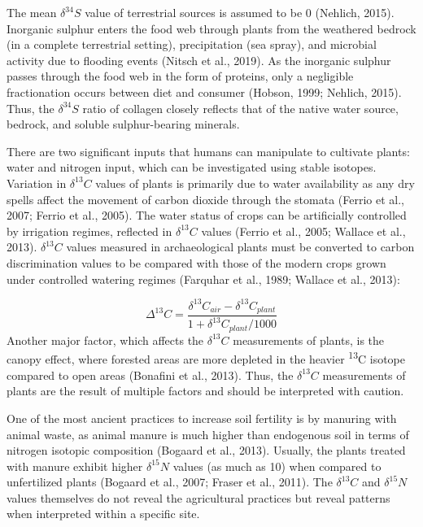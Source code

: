 \documentclass[review]{elsarticle} %
\begin{document}
The mean \(\delta ^{34}S\) value of terrestrial sources is assumed to be 0\text{\textperthousand} (Nehlich, 2015). Inorganic sulphur enters the food web through plants from the weathered bedrock (in a complete terrestrial setting), precipitation (sea spray), and microbial activity due to flooding events (Nitsch et al., 2019). As the inorganic sulphur passes through the food web in the form of proteins, only a negligible fractionation occurs between diet and consumer (Hobson, 1999; Nehlich, 2015). Thus, the \(\delta ^{34}S\) ratio of collagen closely reflects that of the native water source, bedrock, and soluble sulphur-bearing minerals.

There are two significant inputs that humans can manipulate to cultivate plants: water and nitrogen input, which can be investigated using stable isotopes. Variation in \(\delta ^{13}C\) values of plants is primarily due to water availability as any dry spells affect the movement of carbon dioxide through the stomata (Ferrio et al., 2007; Ferrio et al., 2005). The water status of crops can be artificially controlled by irrigation regimes, reflected in \(\delta ^{13}C\) values (Ferrio et al., 2005; Wallace et al., 2013). \(\delta ^{13}C\) values measured in archaeological plants must be converted to carbon discrimination values to be compared with those of the modern crops grown under controlled watering regimes (Farquhar et al., 1989; Wallace et al., 2013):

\[\Delta^{13}C = \frac{\delta ^{13}C_{air} - \delta ^{13}C_{plant}}{1+\delta ^{13}C_{plant}/1000}\]
Another major factor, which affects the \(\delta ^{13}C\) measurements of plants, is the canopy effect, where forested areas are more depleted in the heavier \textsuperscript{13}C isotope compared to open areas (Bonafini et al., 2013). Thus, the \(\delta ^{13}C\) measurements of plants are the result of multiple factors and should be interpreted with caution.

One of the most ancient practices to increase soil fertility is by manuring with animal waste, as animal manure is much higher than endogenous soil in terms of nitrogen isotopic composition (Bogaard et al., 2013). Usually, the plants treated with manure exhibit higher \(\delta ^{15}N\) values (as much as 10\text{\textperthousand}) when compared to unfertilized plants (Bogaard et al., 2007; Fraser et al., 2011). The \(\delta ^{13}C\) and \(\delta ^{15}N\) values themselves do not reveal the agricultural practices but reveal patterns when interpreted within a specific site.
\end{document}
